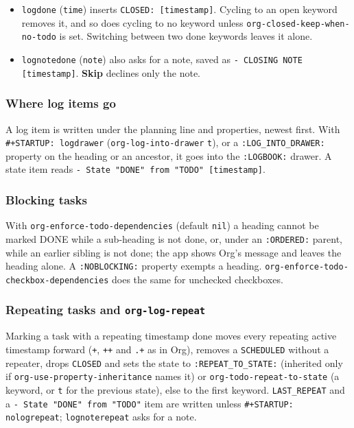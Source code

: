 \documentclass[11pt]{article}
\begin{document}
\begin{itemize}
\item \texttt{logdone} (\texttt{time}) inserts \texttt{CLOSED: [timestamp]}. Cycling to an open keyword removes it, and so does cycling to no keyword unless \texttt{org-closed-keep-when-no-todo} is set. Switching between two done keywords leaves it alone.
\item \texttt{lognotedone} (\texttt{note}) also asks for a note, saved as \texttt{- CLOSING NOTE [timestamp]}. \textbf{Skip} declines only the note.
\end{itemize}

\subsubsection{Where log items go}
\label{sec:org6b55341}

A log item is written under the planning line and properties, newest first. With \texttt{\#+STARTUP: logdrawer} (\texttt{org-log-into-drawer} \texttt{t}), or a \texttt{:LOG\_INTO\_DRAWER:} property on the heading or an ancestor, it goes into the \texttt{:LOGBOOK:} drawer. A state item reads \texttt{- State "DONE"       from "TODO"       [timestamp]}.

\subsubsection{Blocking tasks}
\label{sec:orgaf9bb35}

With \texttt{org-enforce-todo-dependencies} (default \texttt{nil}) a heading cannot be marked DONE while a sub-heading is not done, or, under an \texttt{:ORDERED:} parent, while an earlier sibling is not done; the app shows Org's message and leaves the heading alone. A \texttt{:NOBLOCKING:} property exempts a heading. \texttt{org-enforce-todo-checkbox-dependencies} does the same for unchecked checkboxes.

\subsubsection{Repeating tasks and \texttt{org-log-repeat}}
\label{sec:org828c20d}

Marking a task with a repeating timestamp done moves every repeating active timestamp forward (\texttt{+}, \texttt{++} and \texttt{.+} as in Org), removes a \texttt{SCHEDULED} without a repeater, drops \texttt{CLOSED} and sets the state to \texttt{:REPEAT\_TO\_STATE:} (inherited only if \texttt{org-use-property-inheritance} names it) or \texttt{org-todo-repeat-to-state} (a keyword, or \texttt{t} for the previous state), else to the first keyword. \texttt{LAST\_REPEAT} and a \texttt{- State "DONE" from "TODO"} item are written unless \texttt{\#+STARTUP: nologrepeat}; \texttt{lognoterepeat} asks for a note.
\end{document}
